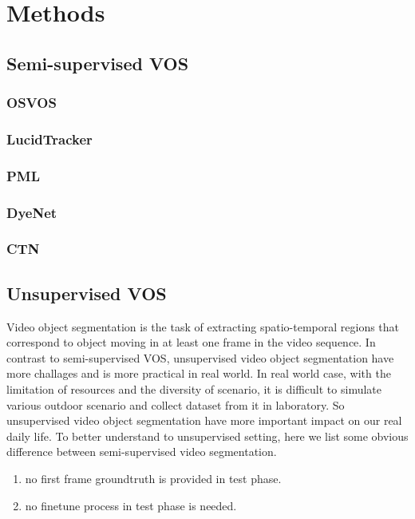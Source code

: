 \section{Methods}

\subsection{Semi-supervised VOS}

\subsubsection{OSVOS}

\subsubsection{LucidTracker}


\subsubsection{PML}


\subsubsection{DyeNet}


\subsubsection{CTN}


\subsection{Unsupervised VOS}
Video object segmentation is the task of extracting spatio-temporal regions that correspond to object moving in at
least one frame in the video sequence. In contrast to semi-supervised VOS, unsupervised video object segmentation have 
more challages and is more practical in real world. In real world case, with the limitation of resources and the diversity of scenario,
it is difficult to simulate various outdoor scenario and collect dataset from it in laboratory. So unsupervised video object 
segmentation have more important impact on our real daily life. To better understand to unsupervised setting, here we list some
obvious difference between semi-supervised video segmentation.
\begin{enumerate}
    \item no first frame groundtruth is provided in test phase.
    \item no finetune process in test phase is needed.
\end{enumerate}

